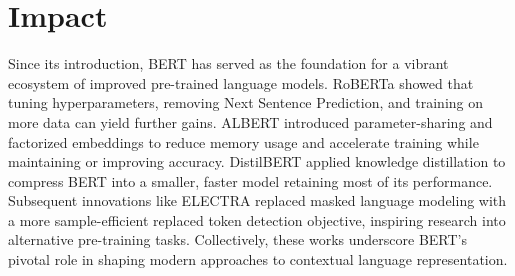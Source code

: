 \documentclass[10pt]{article}
\begin{document}
\section*{Impact}
Since its introduction, BERT has served as the foundation for a vibrant ecosystem of improved pre-trained language models. RoBERTa\cite{DBLP:journals/corr/abs-1907-11692} showed that tuning hyperparameters, removing Next Sentence Prediction, and training on more data can yield further gains. ALBERT\cite{lan2020albertlitebertselfsupervised} introduced parameter-sharing and factorized embeddings to reduce memory usage and accelerate training while maintaining or improving accuracy. DistilBERT\cite{sanh2020distilbertdistilledversionbert} applied knowledge distillation to compress BERT into a smaller, faster model retaining most of its performance. Subsequent innovations like ELECTRA\cite{clark2020electrapretrainingtextencoders} replaced masked language modeling with a more sample-efficient replaced token detection objective, inspiring research into alternative pre-training tasks. Collectively, these works underscore BERT's pivotal role in shaping modern approaches to contextual language representation.



\end{document}
